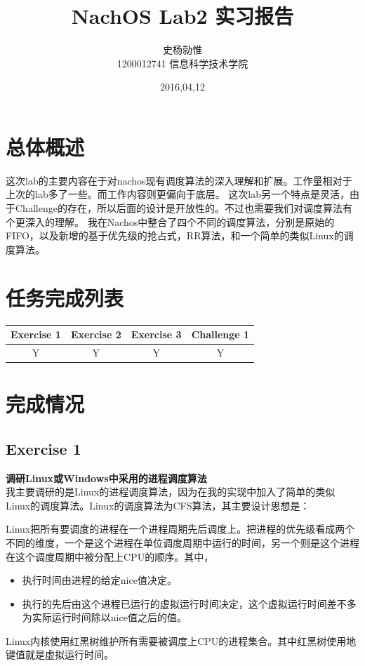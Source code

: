 \documentclass[nofonts]{ctexart}
\begin{document}
\title{%
\vspace{-30mm}\Huge NachOS Lab2 实习报告 \vspace{10mm}}
\author{%
\Large 史杨勍惟 
\\[10mm] 1200012741 信息科学技术学院}
\date{2016,04,12}

\maketitle

\newpage
\tableofcontents
\newpage

\section{总体概述}
这次lab的主要内容在于对nachos现有调度算法的深入理解和扩展。工作量相对于上次的lab多了一些。而工作内容则更偏向于底层。
这次lab另一个特点是灵活，由于Challenge的存在，所以后面的设计是开放性的。不过也需要我们对调度算法有个更深入的理解。
我在Nachos中整合了四个不同的调度算法，分别是原始的FIFO，以及新增的基于优先级的抢占式，RR算法，和一个简单的类似Linux的调度算法。


\section{任务完成列表}
\begin{table}[h]
\centering
\footnotesize
\begin{tabular}{|c|c|c|c|}\hline
\textbf{Exercise 1} & \textbf{Exercise 2} & \textbf{Exercise 3} & \textbf{Challenge 1} \\\hline
Y & Y & Y & Y \\\hline

\end{tabular}

\end{table}
\section{完成情况}
\subsection*{Exercise 1}
\textbf{调研Linux或Windows中采用的进程调度算法}\\
我主要调研的是Linux的进程调度算法，因为在我的实现中加入了简单的类似Linux的调度算法。Linux的调度算法为CFS算法，其主要设计思想是：

Linux把所有要调度的进程在一个进程周期先后调度上。把进程的优先级看成两个不同的维度，一个是这个进程在单位调度周期中运行的时间，另一个则是这个进程在这个调度周期中被分配上CPU的顺序。其中，
\begin{itemize}
\item 执行时间由进程的给定nice值决定。
\item 执行的先后由这个进程已运行的虚拟运行时间决定，这个虚拟运行时间差不多为实际运行时间除以nice值之后的值。
\end{itemize}
Linux内核使用红黑树维护所有需要被调度上CPU的进程集合。其中红黑树使用地键值就是虚拟运行时间。
\end{document}
